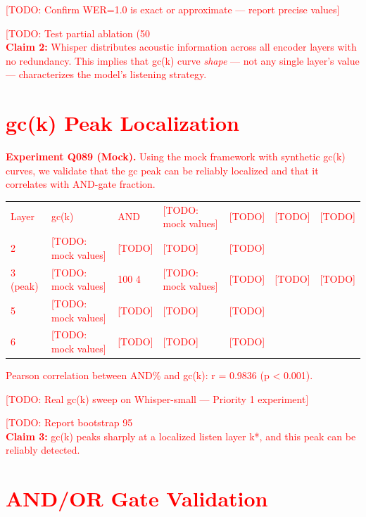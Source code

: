 \documentclass[a4paper]{article}
\begin{document}
\textcolor{red}{[TODO: Confirm WER=1.0 is exact or approximate — report precise values]}
\textcolor{red}{[TODO: Test partial ablation (50\\%

\textbf{Claim 2:} Whisper distributes acoustic information across all encoder layers with no redundancy. This implies that gc(k) curve \textit{shape} — not any single layer's value — characterizes the model's listening strategy.


\section{gc(k) Peak Localization}

\textbf{Experiment Q089 (Mock).} Using the mock framework with synthetic gc(k) curves, we validate that the gc peak can be reliably localized and that it correlates with AND-gate fraction.

\begin{table}[htbp]
\centering
\begin{tabular}{lllll}
\toprule
Layer & gc(k) & AND%
 & \textcolor{red}{[TODO: mock values]} & [TODO] & [TODO] & [TODO] \\
2 & \textcolor{red}{[TODO: mock values]} & [TODO] & [TODO] & [TODO] \\
3 (peak) & \textcolor{red}{[TODO: mock values]} & 100%
4 & \textcolor{red}{[TODO: mock values]} & [TODO] & [TODO] & [TODO] \\
5 & \textcolor{red}{[TODO: mock values]} & [TODO] & [TODO] & [TODO] \\
6 & \textcolor{red}{[TODO: mock values]} & [TODO] & [TODO] & [TODO] \\
\bottomrule
\end{tabular}
\end{table}

Pearson correlation between AND\% and gc(k): r = 0.9836 (p < 0.001).

\textcolor{red}{[TODO: Real gc(k) sweep on Whisper-small — Priority 1 experiment]}
\textcolor{red}{[TODO: Report bootstrap 95\\%

\textbf{Claim 3:} gc(k) peaks sharply at a localized listen layer k*, and this peak can be reliably detected.


\section{AND/OR Gate Validation}

}}
\end{document}
